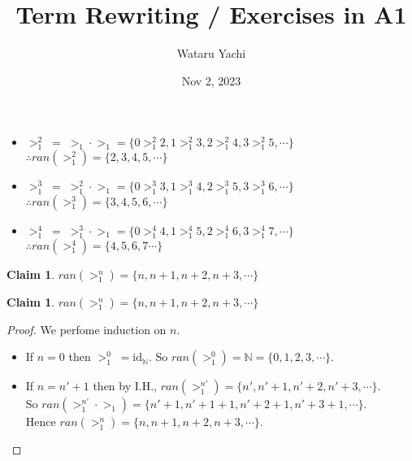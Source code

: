 \documentclass[12pt,aspectratio=169]{beamer}
\title{ Term Rewriting / Exercises in A1 }
\author{Wataru Yachi}
\institute{JAIST}
\date{Nov 2, 2023}
\theoremstyle{claim}
\newtheorem{claim}[theorem]{Claim}%
\begin{document}
\maketitle
\newcommand{\R}[3]{#1 \; #2 \; #3}
\newcommand{\sn}[1]{>_1^{#1}}

\begin{frame}
    \begin{example}
        \begin{itemize}
            \setlength{\itemsep}{+5mm} %
            \item $\sn{2}\; = \; >_1 \cdot >_1 = \{ 0 \sn{2} 2, 1 \sn{2} 3, 2 \sn{2} 4, 3 \sn{2} 5, \cdots \}$
                    \quad $\therefore ran(\sn{2}) = \{2, 3, 4, 5, \cdots \}$
            \item $\sn{3}\; = \; \sn{2} \cdot >_1  = \{ 0 \sn{3} 3, 1 \sn{3} 4, 2 \sn{3} 5, 3 \sn{3} 6, \cdots \}$
            $\therefore ran(\sn{3}) = \{3,4,5,6,\cdots\}$
            \item $\sn{4}\; = \;\sn{3} \cdot >_1 = \{ 0 \sn{4} 4, 1 \sn{4} 5, 2 \sn{4} 6, 3 \sn{4} 7, \cdots \}$
                $\therefore ran(\sn{4}) = \{4,5,6,7\cdots\}$
        \end{itemize}
    \end{example}
    \begin{claim}
        $ran(\sn{n}) = \{n, n+1, n+2, n+3, \cdots\}$
    \end{claim}
\end{frame}

\begin{frame}
    \begin{claim}
        $ran(\sn{n}) = \{n, n+1, n+2, n+3, \cdots\}$
    \end{claim}
    \begin{proof}
        We perfome induction on $n$.
        \begin{itemize}
            \item If $n=0$ then $\sn{0} \; = \mathrm{id}_{\mathbb{N}}$.
            So $ran(\sn{0}) = \mathbb{N} = \{0,1,2,3,\cdots \}$.
            \item If $n=n'+1$ then by I.H., $ran(\sn{n'}) = \{n', n'+1, n'+2, n'+3, \cdots \}$.\\
                    So $ran(\sn{n'} \cdot >_1) = \{n'+1, n'+1+1, n'+2+1, n'+3+1, \cdots \}$.\\
                    Hence $ran(\sn{n}) = \{n, n+1, n+2, n+3, \cdots\}$.
        \end{itemize}
    \end{proof}
\end{frame}
\end{document}
